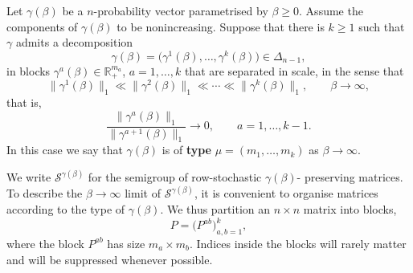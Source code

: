 \documentclass[11pt,a4paper,longbibliography]{amsart}
\numberwithin{equation}{section}
\theoremstyle{plain}
\theoremstyle{definition}
\theoremstyle{remark}
\begin{document}
	Let $\gamma(\beta)$ be a $n$-probability vector parametrised by $\beta\geq0$. Assume the components of $\gamma(\beta)$ to be nonincreasing. Suppose that there is $k\geq1$ such that $\gamma$ admits a decomposition 
	$$
	\gamma(\beta)
	=
	\bigl(
	\gamma^1(\beta),\ldots,\gamma^k(\beta)
	\bigr)\in\Delta_{n-1},
	$$
	in blocks $\gamma^a(\beta)\in\mathbb{R}_{+}^{m_a}$, $a=1,\ldots,k$ that are separated in scale, in the sense that
	$$
	\|\gamma^1(\beta)\|_1
	\ll
	\|\gamma^2(\beta)\|_1
	\ll\cdots\ll
	\|\gamma^k(\beta)\|_1,
	\qquad
	\beta\to\infty,
	$$
	that is,
	$$
	\frac{\|\gamma^a(\beta)\|_1}
	{\|\gamma^{a+1}(\beta)\|_1}
	\to 0,
	\qquad
	a=1,\ldots,k-1.
	$$
	In this case we say that $\gamma(\beta)$ is of \textbf{type} $\mu=(m_1,\ldots, m_k)$ as $\beta\to\infty$.
	
	We write $\mathcal{S}^{\gamma(\beta)}$
	for the semigroup of row-stochastic $\gamma(\beta)$- preserving matrices. 
	To describe the $\beta\to\infty$ limit of $\mathcal{S}^{\gamma(\beta)}$, it is convenient to organise matrices according to the type of $\gamma(\beta)$.
	We thus partition an $n\times n$ matrix into blocks,
	$$
	P=\bigl(P^{ab}\bigr)_{a,b=1}^k,
	$$
	where the block $P^{ab}$ has size $m_a\times m_b$. Indices inside the blocks will rarely matter and will be suppressed whenever possible. 
	
\end{document}
